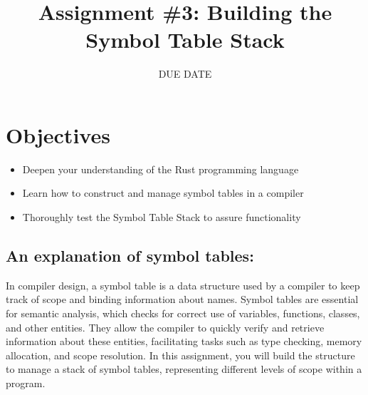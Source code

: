\documentclass[
	12pt, %
]{fphw}
\title{Assignment \#3: Building the Symbol Table Stack} %
\date{DUE DATE} %
\institute{Union College} %
\begin{document}
\maketitle %


\section*{Objectives}

\begin{problem}
	\begin{itemize}
	    \item Deepen your understanding of the Rust programming language
        \item Learn how to construct and manage symbol tables in a compiler
        \item Thoroughly test the Symbol Table Stack to assure functionality
	\end{itemize}
\end{problem}


\subsection*{An explanation of symbol tables:}
In compiler design, a symbol table is a data structure used by a compiler to keep track of scope and binding information about names. Symbol tables are essential for semantic analysis, which checks for correct use of variables, functions, classes, and other entities. They allow the compiler to quickly verify and retrieve information about these entities, facilitating tasks such as type checking, memory allocation, and scope resolution. In this assignment, you will build the structure to manage a stack of symbol tables, representing different levels of scope within a program.
\end{document}
